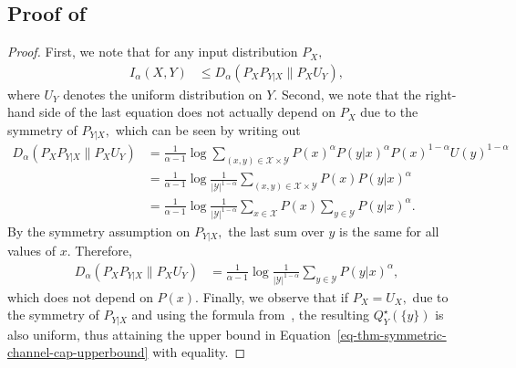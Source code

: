 \documentclass{article}
\numberwithin{theorem}{section}
\numberwithin{example}{section}
\numberwithin{remark}{section}
\numberwithin{definition}{section}
\newcommand{\X}{\mathcal{X}}
\newcommand{\Y}{\mathcal{Y}}
\begin{document}
\subsection{Proof of~}\label{app:proof:thm:symmetric-channel-cap}
\begin{proof}
    First, we note that for any input distribution $P_X,$
    \begin{align}
        I_\alpha(X,Y) & \le D_\alpha ( P_X P_{Y|X} \| P_X U_Y),\label{eq-thm-symmetric-channel-cap-upperbound}
    \end{align}
    where $U_Y$ denotes the uniform distribution on $Y.$ Second, we note that the right-hand side of the last equation does not actually depend on $P_X$ due to the symmetry of $P_{Y|X},$ which can be seen by writing out
     \begin{align}
        D_\alpha ( P_X P_{Y|X} \| P_X U_Y) &= \frac{1}{\alpha-1} \log \sum_{(x,y) \in \X\times\Y} P(x)^\alpha P(y|x)^\alpha P(x)^{1-\alpha}U(y)^{1-\alpha} \\
        &= \frac{1}{\alpha-1} \log \frac{1}{|\Y|^{1-\alpha}}\sum_{(x,y) \in \X\times\Y} P(x) P(y|x)^\alpha \\
        &= \frac{1}{\alpha-1} \log \frac{1}{|\Y|^{1-\alpha}}\sum_{x \in \X} P(x) \sum_{y \in \Y}P(y|x)^\alpha.
    \end{align}
    By the symmetry assumption on $P_{Y|X},$ the last sum over $y$ is the same for all values of $x.$
    Therefore,
     \begin{align}
        D_\alpha ( P_X P_{Y|X} \| P_X U_Y) &=  \frac{1}{\alpha-1} \log \frac{1}{|\Y|^{1-\alpha}} \sum_{y \in \Y}P(y|x)^\alpha,
    \end{align}
    which does not depend on $P(x).$
    Finally, we observe that if $P_X=U_X,$ due to the symmetry of $P_{Y|X}$ and using the formula from~, the resulting $Q^\star_Y(\{y\})$ is also uniform, thus attaining the upper bound in Equation~\eqref{eq-thm-symmetric-channel-cap-upperbound} with equality.
\end{proof}
\end{document}
